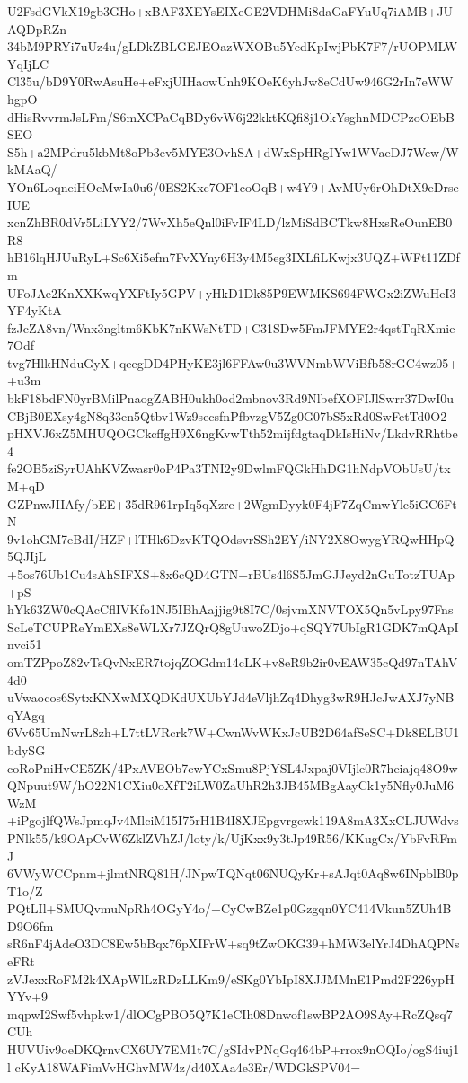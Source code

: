 U2FsdGVkX19gb3GHo+xBAF3XEYsEIXeGE2VDHMi8daGaFYuUq7iAMB+JUAQDpRZn
34bM9PRYi7uUz4u/gLDkZBLGEJEOazWXOBu5YcdKpIwjPbK7F7/rUOPMLWYqIjLC
Cl35u/bD9Y0RwAsuHe+eFxjUIHaowUnh9KOeK6yhJw8eCdUw946G2rIn7eWWhgpO
dHisRvvrmJsLFm/S6mXCPaCqBDy6vW6j22kktKQfi8j1OkYsghnMDCPzoOEbBSEO
S5h+a2MPdru5kbMt8oPb3ev5MYE3OvhSA+dWxSpHRgIYw1WVaeDJ7Wew/WkMAaQ/
YOn6LoqneiHOcMwIa0u6/0ES2Kxc7OF1coOqB+w4Y9+AvMUy6rOhDtX9eDrseIUE
xcnZhBR0dVr5LiLYY2/7WvXh5eQnl0iFvIF4LD/lzMiSdBCTkw8HxsReOunEB0R8
hB16lqHJUuRyL+Sc6Xi5efm7FvXYny6H3y4M5eg3IXLfiLKwjx3UQZ+WFt11ZDfm
UFoJAe2KnXXKwqYXFtIy5GPV+yHkD1Dk85P9EWMKS694FWGx2iZWuHeI3YF4yKtA
fzJcZA8vn/Wnx3ngltm6KbK7nKWsNtTD+C31SDw5FmJFMYE2r4qstTqRXmie7Odf
tvg7HlkHNduGyX+qeegDD4PHyKE3jl6FFAw0u3WVNmbWViBfb58rGC4wz05++u3m
bkF18bdFN0yrBMilPnaogZABH0ukh0od2mbnov3Rd9NlbefXOFIJlSwrr37DwI0u
CBjB0EXsy4gN8q33en5Qtbv1Wz9secsfnPfbvzgV5Zg0G07bS5xRd0SwFetTd0O2
pHXVJ6xZ5MHUQOGCkcffgH9X6ngKvwTth52mijfdgtaqDkIsHiNv/LkdvRRhtbe4
fe2OB5ziSyrUAhKVZwasr0oP4Pa3TNI2y9DwlmFQGkHhDG1hNdpVObUsU/txM+qD
GZPnwJIIAfy/bEE+35dR961rpIq5qXzre+2WgmDyyk0F4jF7ZqCmwYlc5iGC6FtN
9v1ohGM7eBdI/HZF+lTHk6DzvKTQOdsvrSSh2EY/iNY2X8OwygYRQwHHpQ5QJIjL
+5os76Ub1Cu4sAhSIFXS+8x6cQD4GTN+rBUs4l6S5JmGJJeyd2nGuTotzTUAp+pS
hYk63ZW0cQAcCflIVKfo1NJ5IBhAajjig9t8I7C/0sjvmXNVTOX5Qn5vLpy97Fns
ScLeTCUPReYmEXs8eWLXr7JZQrQ8gUuwoZDjo+qSQY7UbIgR1GDK7mQApInvci51
omTZPpoZ82vTsQvNxER7tojqZOGdm14cLK+v8eR9b2ir0vEAW35cQd97nTAhV4d0
uVwaocos6SytxKNXwMXQDKdUXUbYJd4eVljhZq4Dhyg3wR9HJcJwAXJ7yNBqYAgq
6Vv65UmNwrL8zh+L7ttLVRcrk7W+CwnWvWKxJcUB2D64afSeSC+Dk8ELBU1bdySG
coRoPniHvCE5ZK/4PxAVEOb7cwYCxSmu8PjYSL4Jxpaj0VIjle0R7heiajq48O9w
QNpuut9W/hO22N1CXiu0oXfT2iLW0ZaUhR2h3JB45MBgAayCk1y5Nfly0JuM6WzM
+iPgojlfQWsJpmqJv4MlciM15I75rH1B4I8XJEpgvrgcwk119A8mA3XxCLJUWdvs
PNlk55/k9OApCvW6ZklZVhZJ/loty/k/UjKxx9y3tJp49R56/KKugCx/YbFvRFmJ
6VWyWCCpnm+jlmtNRQ81H/JNpwTQNqt06NUQyKr+sAJqt0Aq8w6INpblB0pT1o/Z
PQtLIl+SMUQvmuNpRh4OGyY4o/+CyCwBZe1p0Gzgqn0YC414Vkun5ZUh4BD9O6fm
sR6nF4jAdeO3DC8Ew5bBqx76pXIFrW+sq9tZwOKG39+hMW3elYrJ4DhAQPNseFRt
zVJexxRoFM2k4XApWlLzRDzLLKm9/eSKg0YbIpI8XJJMMnE1Pmd2F226ypHYYv+9
mqpwI2Swf5vhpkw1/dlOCgPBO5Q7K1eCIh08Dnwof1swBP2AO9SAy+RcZQsq7CUh
HUVUiv9oeDKQrnvCX6UY7EM1t7C/gSIdvPNqGq464bP+rrox9nOQIo/ogS4iuj1l
cKyA18WAFimVvHGhvMW4z/d40XAa4e3Er/WDGkSPV04=
